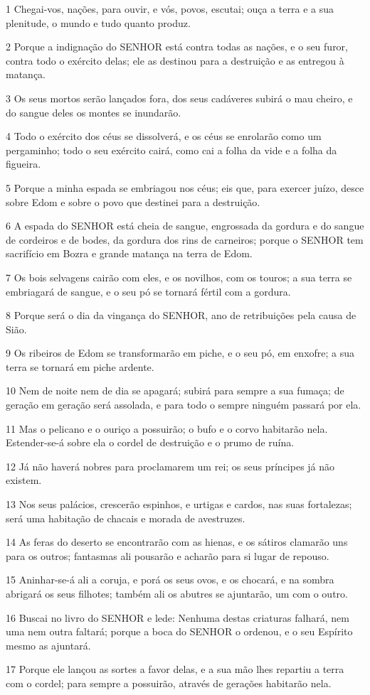 \par 1 Chegai-vos, nações, para ouvir, e vós, povos, escutai; ouça a terra e a sua plenitude, o mundo e tudo quanto produz.
\par 2 Porque a indignação do SENHOR está contra todas as nações, e o seu furor, contra todo o exército delas; ele as destinou para a destruição e as entregou à matança.
\par 3 Os seus mortos serão lançados fora, dos seus cadáveres subirá o mau cheiro, e do sangue deles os montes se inundarão.
\par 4 Todo o exército dos céus se dissolverá, e os céus se enrolarão como um pergaminho; todo o seu exército cairá, como cai a folha da vide e a folha da figueira.
\par 5 Porque a minha espada se embriagou nos céus; eis que, para exercer juízo, desce sobre Edom e sobre o povo que destinei para a destruição.
\par 6 A espada do SENHOR está cheia de sangue, engrossada da gordura e do sangue de cordeiros e de bodes, da gordura dos rins de carneiros; porque o SENHOR tem sacrifício em Bozra e grande matança na terra de Edom.
\par 7 Os bois selvagens cairão com eles, e os novilhos, com os touros; a sua terra se embriagará de sangue, e o seu pó se tornará fértil com a gordura.
\par 8 Porque será o dia da vingança do SENHOR, ano de retribuições pela causa de Sião.
\par 9 Os ribeiros de Edom se transformarão em piche, e o seu pó, em enxofre; a sua terra se tornará em piche ardente.
\par 10 Nem de noite nem de dia se apagará; subirá para sempre a sua fumaça; de geração em geração será assolada, e para todo o sempre ninguém passará por ela.
\par 11 Mas o pelicano e o ouriço a possuirão; o bufo e o corvo habitarão nela. Estender-se-á sobre ela o cordel de destruição e o prumo de ruína.
\par 12 Já não haverá nobres para proclamarem um rei; os seus príncipes já não existem.
\par 13 Nos seus palácios, crescerão espinhos, e urtigas e cardos, nas suas fortalezas; será uma habitação de chacais e morada de avestruzes.
\par 14 As feras do deserto se encontrarão com as hienas, e os sátiros clamarão uns para os outros; fantasmas ali pousarão e acharão para si lugar de repouso.
\par 15 Aninhar-se-á ali a coruja, e porá os seus ovos, e os chocará, e na sombra abrigará os seus filhotes; também ali os abutres se ajuntarão, um com o outro.
\par 16 Buscai no livro do SENHOR e lede: Nenhuma destas criaturas falhará, nem uma nem outra faltará; porque a boca do SENHOR o ordenou, e o seu Espírito mesmo as ajuntará.
\par 17 Porque ele lançou as sortes a favor delas, e a sua mão lhes repartiu a terra com o cordel; para sempre a possuirão, através de gerações habitarão nela.

